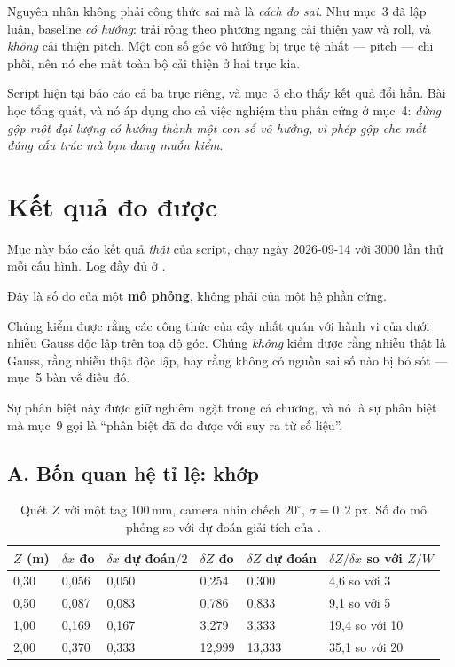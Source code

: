 \documentclass[../../marker.tex]{subfiles}
\begin{document}
Nguyên nhân không phải công thức sai mà là \emph{cách đo sai}. Như  mục~3 đã lập luận, baseline \emph{có hướng}: trải rộng theo phương ngang cải thiện yaw và roll, và \emph{không} cải thiện pitch. Một con số góc vô hướng bị trục tệ nhất --- pitch --- chi phối, nên nó che mất toàn bộ cải thiện ở hai trục kia.

Script hiện tại báo cáo cả ba trục riêng, và mục~3 cho thấy kết quả đổi hẳn. Bài học tổng quát, và nó áp dụng cho cả việc nghiệm thu phần cứng ở mục~4: \emph{đừng gộp một đại lượng có hướng thành một con số vô hướng, vì phép gộp che mất đúng cấu trúc mà bạn đang muốn kiểm}.

\section{Kết quả đo được}

Mục này báo cáo kết quả \emph{thật} của script, chạy ngày 2026-09-14 với 3000 lần thử mỗi cấu hình. Log đầy đủ ở .

\begin{cambay}
Đây là số đo của một \textbf{mô phỏng}, không phải của một hệ phần cứng.

Chúng kiểm được rằng các công thức của cây nhất quán với hành vi của  dưới nhiễu Gauss độc lập trên toạ độ góc. Chúng \emph{không} kiểm được rằng nhiễu thật là Gauss, rằng nhiễu thật độc lập, hay rằng không có nguồn sai số nào bị bỏ sót --- mục~5 bàn về điều đó.

Sự phân biệt này được giữ nghiêm ngặt trong cả chương, và nó là sự phân biệt mà  mục~9 gọi là ``phân biệt đã đo được với suy ra từ số liệu''.
\end{cambay}

\subsection{A. Bốn quan hệ tỉ lệ: khớp}

\begin{table}[H]\centering\small
\caption{Quét \(Z\) với một tag 100\,mm, camera nhìn chếch \(20^\circ\), \(\sigma = 0{,}2\) px. Số đo mô phỏng so với dự đoán giải tích của .}
\label{tab:c16-scale}
\begin{tabularx}{\linewidth}{@{}L{1.3cm}L{1.6cm}L{1.9cm}L{1.6cm}L{1.9cm}Y@{}}
\toprule
\(Z\) (m) & \(\delta x\) đo & \(\delta x\) dự đoán\(/2\) & \(\delta Z\) đo & \(\delta Z\) dự đoán & \(\delta Z/\delta x\) so với \(Z/W\)\\
,30 & 0,056 & 0,050 & 0,254 & 0,300 & 4,6 so với 3\\
0,50 & 0,087 & 0,083 & 0,786 & 0,833 & 9,1 so với 5\\
1,00 & 0,169 & 0,167 & 3,279 & 3,333 & 19,4 so với 10\\
2,00 & 0,370 & 0,333 & 12,999 & 13,333 & 35,1 so với 20\\
\bottomrule
\end{tabularx}
\end{table}
\end{document}
